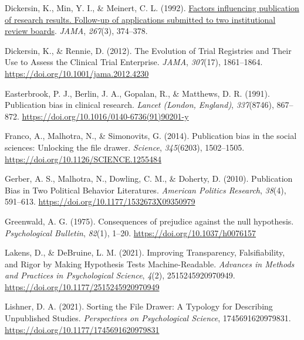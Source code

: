 \documentclass[
  ,jou, a4paper,floatsintext]{apa6}
\newlength{\cslhangindent}
\newlength{\cslentryspacingunit} %
\newenvironment{CSLReferences}[2] %
 {%
  \setlength{\parindent}{0pt}
  \ifodd #1
  \let\oldpar\par
  \def\par{\hangindent=\cslhangindent\oldpar}
  \fi
  \setlength{\parskip}{#2\cslentryspacingunit}
 }%
 {}
\begin{document}
\begin{CSLReferences}{1}{0}
\leavevmode{}%
Dickersin, K., Min, Y. I., \& Meinert, C. L. (1992). \href{https://www.ncbi.nlm.nih.gov/pubmed/1727960}{Factors influencing publication of research results. {Follow-up} of applications submitted to two institutional review boards}. \emph{JAMA}, \emph{267}(3), 374--378.

\leavevmode{}%
Dickersin, K., \& Rennie, D. (2012). The {Evolution} of {Trial Registries} and {Their Use} to {Assess} the {Clinical Trial Enterprise}. \emph{JAMA}, \emph{307}(17), 1861--1864. \url{https://doi.org/10.1001/jama.2012.4230}

\leavevmode{}%
Easterbrook, P. J., Berlin, J. A., Gopalan, R., \& Matthews, D. R. (1991). Publication bias in clinical research. \emph{Lancet (London, England)}, \emph{337}(8746), 867--872. \url{https://doi.org/10.1016/0140-6736(91)90201-y}

\leavevmode{}%
Franco, A., Malhotra, N., \& Simonovits, G. (2014). Publication bias in the social sciences: {Unlocking} the file drawer. \emph{Science}, \emph{345}(6203), 1502--1505. \url{https://doi.org/10.1126/SCIENCE.1255484}

\leavevmode{}%
Gerber, A. S., Malhotra, N., Dowling, C. M., \& Doherty, D. (2010). Publication {Bias} in {Two Political Behavior Literatures}. \emph{American Politics Research}, \emph{38}(4), 591--613. \url{https://doi.org/10.1177/1532673X09350979}

\leavevmode{}%
Greenwald, A. G. (1975). Consequences of prejudice against the null hypothesis. \emph{Psychological Bulletin}, \emph{82}(1), 1--20. \url{https://doi.org/10.1037/h0076157}

\leavevmode{}%
Lakens, D., \& DeBruine, L. M. (2021). Improving {Transparency}, {Falsifiability}, and {Rigor} by {Making Hypothesis Tests Machine-Readable}. \emph{Advances in Methods and Practices in Psychological Science}, \emph{4}(2), 2515245920970949. \url{https://doi.org/10.1177/2515245920970949}

\leavevmode{}%
Lishner, D. A. (2021). Sorting the {File Drawer}: {A Typology} for {Describing Unpublished Studies}. \emph{Perspectives on Psychological Science}, 1745691620979831. \url{https://doi.org/10.1177/1745691620979831}


\end{CSLReferences}
\end{document}

